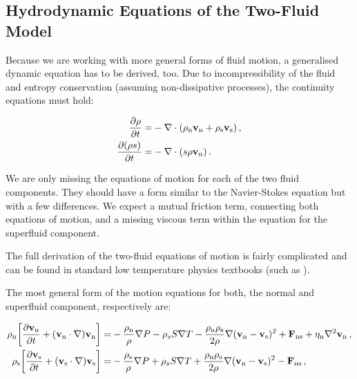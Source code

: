 \subsection*{Hydrodynamic Equations of the Two-Fluid Model}

Because we are working with more general forms of fluid motion, a generalised dynamic equation has to be derived, too. Due to incompressibility of the fluid and entropy conservation (assuming non-dissipative processes), the continuity equations must hold:

\begin{align}
\frac{\partial \rho}{\partial t}
=&
- \nabla \cdot (\rho_{\mathrm{n}} \mathbf{v_{\mathrm{n}}}
+ \rho_{\mathrm{s}} \mathbf{v_{\mathrm{s}}})
\label{cont_mass}\,,\\
\frac{\partial (\rho s)}{\partial t}=&
- \nabla \cdot (s\rho\mathbf{v_{\mathrm{n}}})\,.
\label{cont_entropy}
\end{align}

We are only missing the equations of motion for each of the two fluid components. They should have a form similar to the Navier-Stokes equation but with a few differences. We expect a mutual friction term, connecting both equations of motion, and a missing viscous term within the equation for the superfluid component.

The full derivation of the two-fluid equations of motion is fairly complicated and can be found in standard low temperature physics textbooks (such as \cite{skrbek}).

\newpage

The most general form of the motion equations for both, the normal and superfluid component, respectively are:

\begin{align}
\rho_{\ind n} \bigg [\frac{\partial\vec{v_{\ind n}}}{\partial t}
+ (\vec{v_{\ind n}}\cdot \nabla)\vec{v_{\ind n}} \bigg ]
=& -\frac{\rho_{\ind n}}{\rho} \nabla P
- \rho_s S \nabla T
- \frac{\rho_{\ind n}\rho_{\ind s}}{2\rho}
\nabla (\vec{v_{\ind n}}-\vec{v_{\ind s}})^2
+ \vec{F_{\ind {ns}}}
+ \eta_\ind{n} \nabla^2 \vec{v_\ind{n}}\,,
\label{motion_normal}\\
\rho_{\ind s} \bigg [\frac{\partial \vec{v_{\ind s}}}{\partial t}
+ (\vec{v_{\ind s}}\cdot \nabla)\vec{v_{\ind s}} \bigg ]
=& -\frac{\rho_{\ind s}}{\rho} \nabla P
+ \rho_s S \nabla T
+ \frac{\rho_{\ind n}\rho_{\ind s}}{2\rho}
\nabla (\vec{v_{\ind n}}-\vec{v_{\ind s}})^2
- \vec{F_{\ind {ns}}}\,,
\hspace{15mm}
\label{motion_super}
\end{align}

